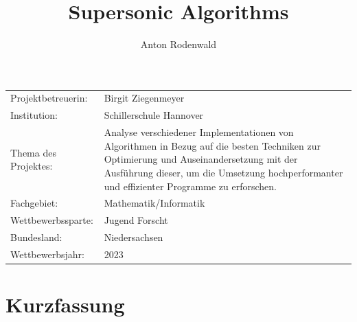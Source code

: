 \documentclass[10pt,a4paper]{article}
\begin{document}
\title{Supersonic Algorithms}
\author{Anton Rodenwald}

\maketitle

\large\begin{tabular}{l p{12cm}}

    Projektbetreuerin: & Birgit Ziegenmeyer \\

    Institution: & Schillerschule Hannover \\
    
    Thema des Projektes: 
    & Analyse verschiedener Implementationen von Algorithmen 
    in Bezug auf die besten Techniken zur Optimierung 
    und Auseinandersetzung mit der Ausführung dieser,
    um die Umsetzung hochperformanter und effizienter
    Programme zu erforschen. \\

    Fachgebiet: & Mathematik/Informatik \\

    Wettbewerbssparte: & Jugend Forscht \\
    
    Bundesland: & Niedersachsen \\
    
    Wettbewerbsjahr: & 2023 \\
    
\end{tabular}

\clearpage

\begin{bchart}
\end{bchart}

\section*{Kurzfassung}
\end{document}
